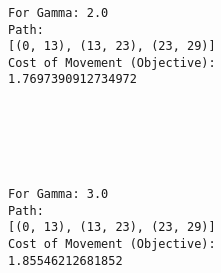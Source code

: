 \documentclass[11pt]{article}
\begin{document}
    \begin{center}
    \end{center}
    { \hspace*{\fill} \\}
    
    \begin{center}
    \end{center}
    { \hspace*{\fill} \\}
    
    \begin{Verbatim}[commandchars=\\\{\}]

For Gamma: 2.0
Path:
[(0, 13), (13, 23), (23, 29)]
Cost of Movement (Objective):
1.7697390912734972

    \end{Verbatim}

    \begin{center}
    \end{center}
    { \hspace*{\fill} \\}
    
    \begin{center}
    \end{center}
    { \hspace*{\fill} \\}
    
    \begin{Verbatim}[commandchars=\\\{\}]

For Gamma: 3.0
Path:
[(0, 13), (13, 23), (23, 29)]
Cost of Movement (Objective):
1.85546212681852

    \end{Verbatim}

    \begin{center}
    \end{center}
    { \hspace*{\fill} \\}
    
    \begin{center}
    \end{center}
    { \hspace*{\fill} \\}
    
\end{document}
